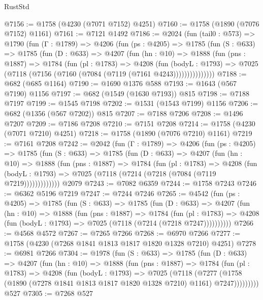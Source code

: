 \begin{lexlean}{RustStd}
\begin{coremodule}
@7156 := @1758 (@4230 (@7071 @7152) @4251)
@7160 := @1758 (@1890 (@7076 @7152) @1161)
@7161 := @7121 @1492
@7186 := @2024
    (fun (tail0 : @573) =>
    @1790
      (fun (Γ : @1789) =>
      @4206
        (fun (ps : @4205) =>
        @1785
          (fun (S : @633) =>
          @1785
            (fun (D : @633) =>
            @4207
              (fun (hn : @10) =>
              @1888
                (fun (pns : @1887) =>
                @1784
                  (fun (pl : @1783) =>
                  @4208
                    (fun (bodyL : @1793) =>
                    @7025 (@7118 (@7156 (@7160 (@7084 (@7119 (@7161 @4243)))))))))))))))
@7188 := @682 (@685 @1164)
@7190 := @1690 @1376 @588
@7193 := @1643 (@567 @7190) @1156
@7197 := @682 (@1549 (@1630 @7193)) @815
@7198 := @7188 @7197
@7199 := @1545 @7198
@7202 := @1531 (@1543 @7199) @1156
@7206 := @682 (@1356 (@567 @7202)) @815
@7207 := @7188 @7206
@7208 := @1496 @7207
@7209 := @7186 @7208
@7210 := @7151 @7208
@7214 := @1758 (@4230 (@7071 @7210) @4251)
@7218 := @1758 (@1890 (@7076 @7210) @1161)
@7219 := @7161 @7208
@7242 := @2042
    (fun (Γ : @1789) =>
    @4206
      (fun (ps : @4205) =>
      @1785
        (fun (S : @633) =>
        @1785
          (fun (D : @633) =>
          @4207
            (fun (hn : @10) =>
            @1888
              (fun (pns : @1887) =>
              @1784
                (fun (pl : @1783) =>
                @4208
                  (fun (bodyL : @1793) =>
                  @7025 (@7118 (@7214 (@7218 (@7084 (@7119 @7219)))))))))))))
    @2079
@7243 := @7082 @6359
@7244 := @1758 @7243
@7246 := @6362 @5196 @7219
@7247 := @7244 @7246
@7265 := @4542
    (fun (ps : @4205) =>
    @1785
      (fun (S : @633) =>
      @1785
        (fun (D : @633) =>
        @4207
          (fun (hn : @10) =>
          @1888
            (fun (pns : @1887) =>
            @1784
              (fun (pl : @1783) =>
              @4208 (fun (bodyL : @1793) => @7025 (@7118 (@7214 (@7218 @7247))))))))))
@7266 := @4568 @4572
@7267 := @7265 @7266
@7268 := @6970 @7266
@7277 := @1758 (@4230 (@7268 @1841 @1813 @1817 @1820 @1328 @7210) @4251)
@7278 := @6981 @7266
@7304 := @1978
    (fun (S : @633) =>
    @1785
      (fun (D : @633) =>
      @4207
        (fun (hn : @10) =>
        @1888
          (fun (pns : @1887) =>
          @1784
            (fun (pl : @1783) =>
            @4208
              (fun (bodyL : @1793) =>
              @7025
                (@7118
                  (@7277
                    (@1758 (@1890 (@7278 @1841 @1813 @1817 @1820 @1328 @7210) @1161) @7247)))))))))
    @527
@7305 := @7268 @527

\end{coremodule}
\end{lexlean}
